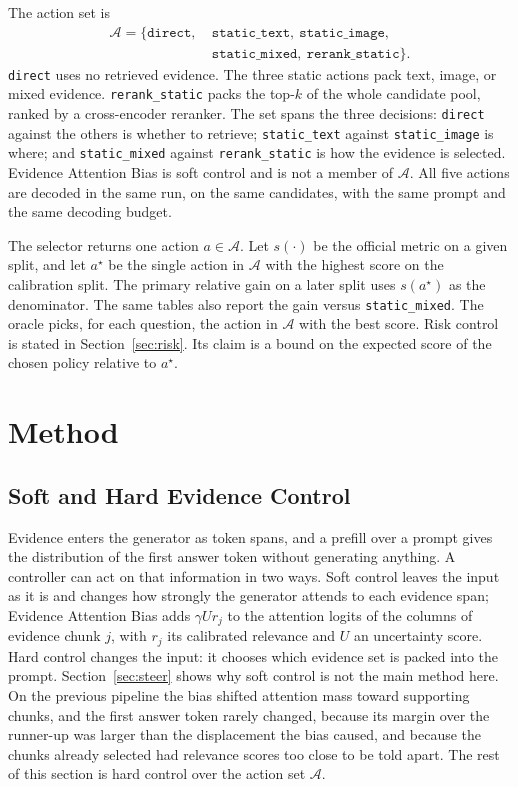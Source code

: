 \documentclass[sigconf,anonymous,review]{acmart}
\begin{document}
The action set is
\begin{equation}
\begin{aligned}
\mathcal{A}=\{\texttt{direct},\ &\texttt{static\_text},\ \texttt{static\_image},\\
&\texttt{static\_mixed},\ \texttt{rerank\_static}\}.
\end{aligned}
\label{eq:actions}
\end{equation}
\texttt{direct} uses no retrieved evidence.
The three static actions pack text, image, or mixed evidence.
\texttt{rerank\_static} packs the top-$k$ of the whole candidate pool, ranked by a cross-encoder reranker.
The set spans the three decisions: \texttt{direct} against the others is whether to retrieve; \texttt{static\_text} against \texttt{static\_image} is where; and \texttt{static\_mixed} against \texttt{rerank\_static} is how the evidence is selected.
Evidence Attention Bias is soft control and is not a member of $\mathcal{A}$.
All five actions are decoded in the same run, on the same candidates, with the same prompt and the same decoding budget.

The selector returns one action $a\in\mathcal{A}$.
Let $s(\cdot)$ be the official metric on a given split, and let $a^{\star}$ be the single action in $\mathcal{A}$ with the highest score on the calibration split.
The primary relative gain on a later split uses $s(a^{\star})$ as the denominator.
The same tables also report the gain versus \texttt{static\_mixed}.
The oracle picks, for each question, the action in $\mathcal{A}$ with the best score.
Risk control is stated in Section~\ref{sec:risk}.
Its claim is a bound on the expected score of the chosen policy relative to $a^{\star}$.

\section{Method}
\label{sec:method}

\subsection{Soft and Hard Evidence Control}
\label{sec:softhard}
Evidence enters the generator as token spans, and a prefill over a prompt gives the distribution of the first answer token without generating anything.
A controller can act on that information in two ways.
Soft control leaves the input as it is and changes how strongly the generator attends to each evidence span; Evidence Attention Bias adds $\gamma U r_j$ to the attention logits of the columns of evidence chunk $j$, with $r_j$ its calibrated relevance and $U$ an uncertainty score.
Hard control changes the input: it chooses which evidence set is packed into the prompt.
Section~\ref{sec:steer} shows why soft control is not the main method here.
On the previous pipeline the bias shifted attention mass toward supporting chunks, and the first answer token rarely changed, because its margin over the runner-up was larger than the displacement the bias caused, and because the chunks already selected had relevance scores too close to be told apart.
The rest of this section is hard control over the action set $\mathcal{A}$.
\end{document}
